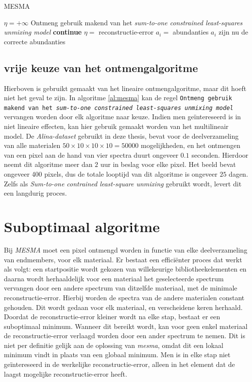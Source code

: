\documentclass[12pt]{report}
\begin{document}
\begin{algorithm}
\caption{MESMA\label{al:mesma}}
\begin{algorithmic}[1]
\State $\eta = +\infty$ 
\State Ontmeng gebruik makend van het \textit{sum-to-one constrained least-squares unmixing model}
\State \textbf{continue}
\EndIf
{}
\State $\eta = $ reconstructie-error
\State $a_i = $ abundanties
\EndIf
\EndFor
\EndFor
\State $a_i$ zijn nu de correcte abundanties
\end{algorithmic}
\end{algorithm}

\subsection{vrije keuze van het ontmengalgoritme}
Hierboven is gebruikt gemaakt van het lineaire ontmengalgoritme, maar dit hoeft niet het geval te zijn. In algoritme \ref{al:mesma} kan de regel \texttt{Ontmeng gebruik makend van het \textit{sum-to-one constrained least-squares unmixing model}} vervangen worden door elk algoritme naar keuze. Indien men ge\"intereseerd is in niet lineaire effecten, kan hier gebruik gemaakt worden van het multilineair model. De \textit{Alina-dataset} gebruikt in deze thesis, bevat voor de deelverzameling van alle materialen $50\times 10\times 10 \times 10= 50000$ mogelijkheden, en het ontmengen van een pixel aan de hand van vier spectra  duurt ongeveer $0.1$ seconden. Hierdoor neemt dit algoritme meer dan $2$ uur in beslag voor elke pixel. Het beeld bevat ongeveer 400 pixels, dus de totale looptijd van dit algoritme is ongeveer $25$ dagen. Zelfs als \textit{Sum-to-one contrained least-square unmixing} gebruikt wordt, levert dit een langdurig proces.

\section{Suboptimaal algoritme} \label{sec:AAM}

Bij \textit{MESMA} moet een pixel ontmengd worden in functie van elke deelverzameling van endmembers, voor elk materiaal.  Er bestaat een effici\"enter proces dat werkt als volgt: een startpositie wordt gekozen van willekeurige bibliotheekelementen en daarna wordt herhaaldelijk voor een materiaal het geselecteerde spectrum vervangen door een andere spectrum van ditzelfde materiaal, met de minimale reconstructie-error. Hierbij worden de spectra van de andere materialen constant gehouden. Dit wordt gedaan voor elk materiaal, en verscheidene keren herhaald. 
Doordat de reconstructie-error kleiner wordt na elke stap, bestaat er een suboptimaal minimum. Wanneer dit bereikt wordt, kan voor geen enkel materiaal de reconstructie-error verlaagd worden door een ander spectrum te nemen. Dit is niet per definitie gelijk aan de oplossing van \textit{mesma}, omdat dit een lokaal minimum vindt in plaats van een globaal minimum.
Men is in elke stap niet ge\"intereseerd in de werkelijke reconstructie-error, alleen in het element dat de laagst mogelijke reconstructie-error heeft.
\end{document}
